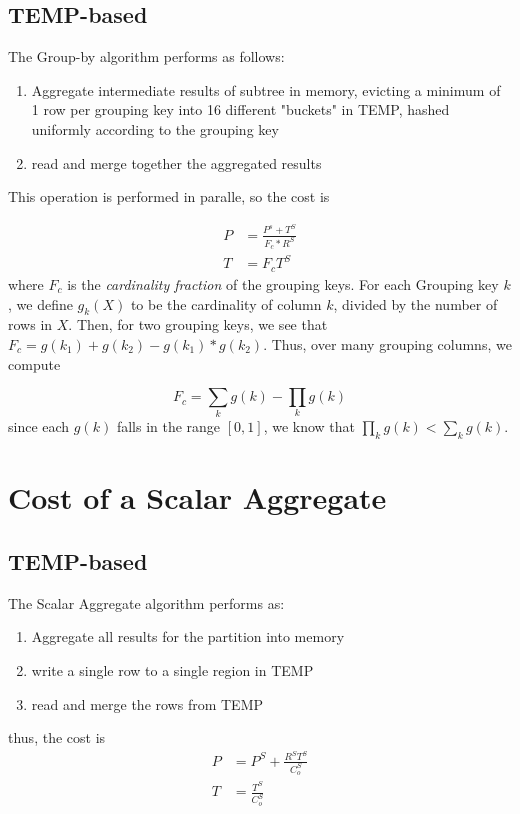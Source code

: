 \documentclass[10pt]{amsart}
\begin{document}
\subsection{TEMP-based}
The Group-by algorithm performs as follows:
\begin{enumerate}
				\item Aggregate intermediate results of subtree in memory, evicting a minimum of 1 row per grouping key into 16 different "buckets" in TEMP, hashed uniformly according to the grouping key
				\item read and merge together the aggregated results
\end{enumerate}
This operation is performed in paralle, so the cost is

\begin{equation}
				\begin{aligned}
								P &= \frac{P^s +T^S}{F_c*R^S} \\
								T &= F_cT^S
				\end{aligned}
\end{equation}
where $F_c$ is the \emph{cardinality fraction} of the grouping keys. For each Grouping key $k$, we define $g_k(X)$ to be the cardinality of column $k$, divided by the number of rows in $X$. Then, for two grouping keys, we see that $F_c = g(k_1) + g(k_2) - g(k_1)*g(k_2)$. Thus, over many grouping columns, we compute 

\begin{equation*}
				F_c= \sum_k g(k) - \prod_k g(k)
\end{equation*}
since each $g(k)$ falls in the range $[0,1]$, we know that $\prod_k g(k) < \sum_k g(k)$.

\section{Cost of a Scalar Aggregate}
\subsection{TEMP-based}
The Scalar Aggregate algorithm performs as:
\begin{enumerate}
				\item Aggregate all results for the partition into memory
				\item write a single row to a single region in TEMP
				\item read and merge the rows from TEMP
\end{enumerate}

thus, the cost is
\begin{equation}
				\begin{aligned}
								P &= P^S + \frac{R^ST^S}{C_o^S} \\
								T &= \frac{T^S}{C_o^S}
				\end{aligned}
\end{equation}
\end{document}
